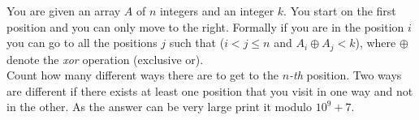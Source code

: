 %

You are given an array $A$ of $n$ integers and an integer $k$. You start on the first position and you can only move to the right. Formally if you are in the position $i$ you can go to all the positions $j$ such that ($i < j \le n$ and $A_i \oplus A_j < k$), where $\oplus$ denote the \textit{xor} operation (exclusive or).\\

Count how many different ways there are to get to the $n$\textit{-th} position. Two ways are different if there exists at least one position that you visit in one way and not in the other. As the answer can be very large print it modulo $10^9+7$.\\

%
%



%
%




\sampleio
